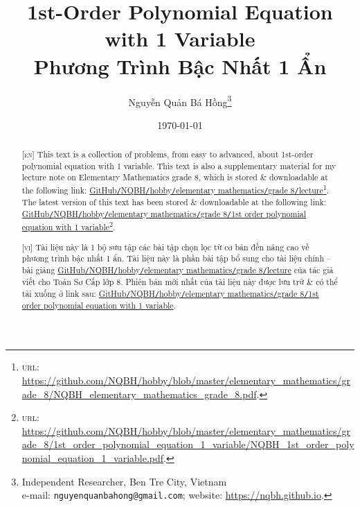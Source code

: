 \documentclass{article}
\title{1st-Order Polynomial Equation with 1 Variable\\Phương Trình Bậc Nhất 1 Ẩn}
\author{Nguyễn Quản Bá Hồng\footnote{Independent Researcher, Ben Tre City, Vietnam\\e-mail: \texttt{nguyenquanbahong@gmail.com}; website: \url{https://nqbh.github.io}.}}
\date{\today}
\begin{document}
\maketitle
\begin{abstract}
	\textsc{[en]} This text is a collection of problems, from easy to advanced, about 1st-order polynomial equation with 1 variable. This text is also a supplementary material for my lecture note on Elementary Mathematics grade 8, which is stored \& downloadable at the following link: \href{https://github.com/NQBH/hobby/blob/master/elementary_mathematics/grade_8/NQBH_elementary_mathematics_grade_8.pdf}{GitHub\texttt{/}NQBH\texttt{/}hobby\texttt{/}elementary mathematics\texttt{/}grade 8\texttt{/}lecture}\footnote{\textsc{url}: \url{https://github.com/NQBH/hobby/blob/master/elementary_mathematics/grade_8/NQBH_elementary_mathematics_grade_8.pdf}.}. The latest version of this text has been stored \& downloadable at the following link: \href{https://github.com/NQBH/hobby/blob/master/elementary_mathematics/grade_8/1st_order_polynomial_equation_1_variable/NQBH_1st_order_polynomial_equation_1_variable.pdf}{GitHub\texttt{/}NQBH\texttt{/}hobby\texttt{/}elementary mathematics\texttt{/}grade 8\texttt{/}1st order polynomial equation with 1 variable}\footnote{\textsc{url}: \url{https://github.com/NQBH/hobby/blob/master/elementary_mathematics/grade_8/1st_order_polynomial_equation_1_variable/NQBH_1st_order_polynomial_equation_1_variable.pdf}.}.
	\vspace{2mm}
	
	\textsc{[vi]} Tài liệu này là 1 bộ sưu tập các bài tập chọn lọc từ cơ bản đến nâng cao về phương trình bậc nhất 1 ẩn. Tài liệu này là phần bài tập bổ sung cho tài liệu chính -- bài giảng \href{https://github.com/NQBH/hobby/blob/master/elementary_mathematics/grade_8/NQBH_elementary_mathematics_grade_8.pdf}{GitHub\texttt{/}NQBH\texttt{/}hobby\texttt{/}elementary mathematics\texttt{/}grade 8\texttt{/}lecture} của tác giả viết cho Toán Sơ Cấp lớp 8. Phiên bản mới nhất của tài liệu này được lưu trữ \& có thể tải xuống ở link sau: \href{https://github.com/NQBH/hobby/blob/master/elementary_mathematics/grade_8/1st_order_polynomial_equation_1_variable/NQBH_1st_order_polynomial_equation_1_variable.pdf}{GitHub\texttt{/}NQBH\texttt{/}hobby\texttt{/}elementary mathematics\texttt{/}grade 8\texttt{/}1st order polynomial equation with 1 variable}.
\end{abstract}
\setcounter{secnumdepth}{4}
\setcounter{tocdepth}{3}
\tableofcontents
\newpage

\end{document}
